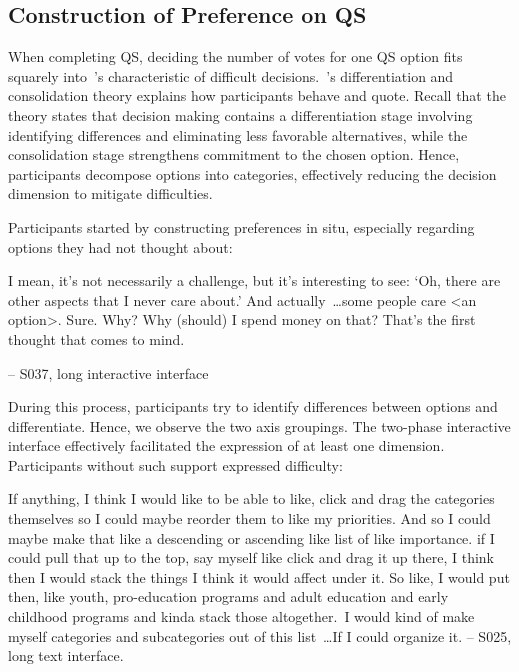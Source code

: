 

\subsection{Construction of Preference on QS}

When completing QS, deciding the number of votes for one QS option fits squarely into~\textcite{lichtensteinConstructionPreference2006}'s characteristic of difficult decisions.~\textcite{svensonDifferentiationConsolidationTheory1992}'s differentiation and consolidation theory explains how participants behave and quote. Recall that the theory states that decision making contains a differentiation stage involving identifying differences and eliminating less favorable alternatives, while the consolidation stage strengthens commitment to the chosen option. Hence, participants decompose options into categories, effectively reducing the decision dimension to mitigate difficulties.

Participants started by constructing preferences in situ, especially regarding options they had not thought about:
\begin{displayquote}

    I mean, it's not necessarily a challenge, but it's interesting to see: `Oh, there are other aspects that I never care about.' And actually~\ldots some people care <an option>. Sure. Why? Why (should) I spend money on that? That's the first thought that comes to mind.
    
    \noindent \hfill -- S037, long interactive interface
\end{displayquote}

During this process, participants try to identify differences between options and differentiate. Hence, we observe the two axis groupings. The two-phase interactive interface effectively facilitated the expression of at least one dimension. Participants without such support expressed difficulty:

\begin{displayquote}
    If anything, I think I would like to be able to like, click and drag the categories themselves so I could maybe reorder them to like my priorities. And so I could maybe make that like a descending or ascending like list of like importance. \bracketellipsis if I could pull that up to the top, say myself like click and drag it up there, I think then I would stack the things I think it would affect under it. So like, I would put then, like youth, pro-education programs and adult education and early childhood programs and kinda stack those altogether.~\bracketellipsis I would kind of make myself categories and subcategories out of this list~\ldots If I could organize it.
    \noindent \hfill -- S025, long text interface.
\end{displayquote}

